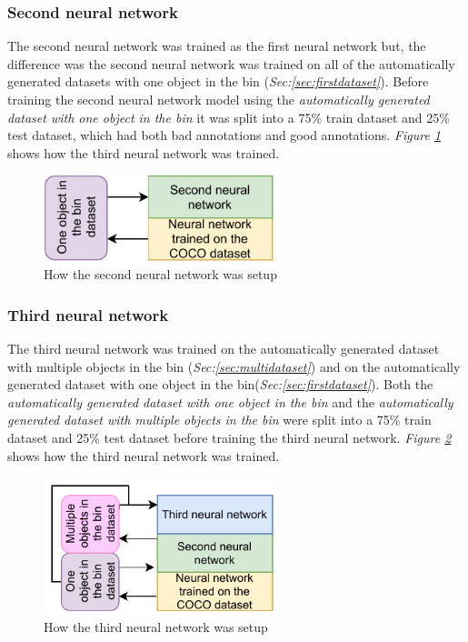 \subsubsection{Second neural network}
The second neural network was trained as the first neural network but, the difference was the second neural network was trained on all of the automatically generated datasets with one object in the bin (\textit{Sec:\ref{sec:firstdataset}}). Before training the second neural network model using the \textit{automatically generated dataset with one object in the bin}  it was split into a 75\% train dataset and 25\% test dataset, which had both bad annotations and good annotations. \textit{Figure \ref{fig:secondneural}} shows how the third neural network was trained.


\begin{figure}[h]
    \centering
    \includegraphics[width=0.6\textwidth]{graphics/results/secondneural.pdf}
    \caption{How the second neural network was setup}
    \label{fig:secondneural}
\end{figure}

\subsubsection{Third neural network}
The third neural network was trained on the automatically generated dataset with multiple objects in the bin (\textit{Sec:\ref{sec:multidataset}}) and on the automatically generated dataset with one object in the bin(\textit{Sec:\ref{sec:firstdataset}}). Both the \textit{automatically generated dataset with one object in the bin} and the \textit{automatically generated dataset with multiple objects in the bin} were split into a 75\% train dataset and 25\% test dataset before training the third neural network. \textit{Figure \ref{fig:thirdneural}} shows how the third neural network was trained.

\begin{figure}[h]
    \centering
    \includegraphics[width=0.6\textwidth]{graphics/results/thirdneural.pdf}
    \caption{How the third neural network was setup}
    \label{fig:thirdneural}
\end{figure}